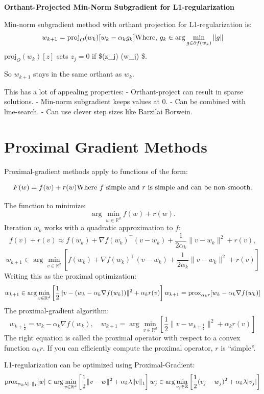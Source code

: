 \documentclass[
]{article}
\begin{document}
\textbf{Orthant-Projected Min-Norm Subgradient for L1-regularization}

Min-norm subgradient method with orthant projection for L1-regularization is:
\[
w_{k+1} = \text{proj}_O(w_k) [w_k - \alpha_k g_k]\\
\text{Where, } g_k \in \arg\min_{g \in \partial f(w_k)} \|g\|
\]
\(\text{proj}_O(w_k) [z]\) sets \(z_j = 0\) if \$(z\_j) \neq {}(w\_j) \$.

So \(w_{k+1}\) stays in the same orthant as \(w_k\).

This has a lot of appealing properties:
- Orthant-project can result in sparse solutions.
- Min-norm subgradient keeps values at 0.
- Can be combined with line-search.
- Can use clever step sizes like Barzilai Borwein.

\section{Proximal Gradient Methods}\label{proximal-gradient-methods}

Proximal-gradient methods apply to functions of the form:

\[
F(w) = f(w) + r(w)\\
\text{Where } f \text{ simple and } r \text{ is simple and can be non-smooth.}
\]

The function to minimize:
\[
\arg\min_{w \in \mathbb{R}^d} f(w) + r(w).
\]
Iteration \(w_k\) works with a quadratic approximation to \(f\):
\[
f(v) + r(v) \approx f(w_k) + \nabla f(w_k)^\top (v - w_k) + \frac{1}{2\alpha_k} \|v - w_k\|^2 + r(v),
\]
\[
w_{k+1} \in \arg\min_{v \in \mathbb{R}^d} \left[ f(w_k) + \nabla f(w_k)^\top (v - w_k) + \frac{1}{2\alpha_k} \|v - w_k\|^2 + r(v) \right]
\]
Writing this as the proximal optimization:
\[
w_{k+1} \in \arg\min_{v \in \mathbb{R}^d} \left[ \frac{1}{2} \|v - (w_k - \alpha_k \nabla f(w_k))\|^2 + \alpha_k r(v) \right]\\
w_{k+1} = \text{prox}_{\alpha_k r} [w_k - \alpha_k \nabla f(w_k)]
\]
The proximal-gradient algorithm:
\[
w_{k+\frac{1}{2}} = w_k - \alpha_k \nabla f(w_k), \quad w_{k+1} = \arg\min_{v \in \mathbb{R}^d} \left[ \frac{1}{2} \|v - w_{k+\frac{1}{2}}\|^2 + \alpha_k r(v) \right]
\]
The right equation is called the proximal operator with respect to a convex function \(\alpha_k r\). If you can efficiently compute the proximal operator, \(r\) is ``simple''.

L1-regularization can be optimized using Proximal-Gradient:
\[
\text{prox}_{\alpha_k \lambda \|\cdot\|_1} [w] \in \arg\min_{v \in \mathbb{R}^d} \left[ \frac{1}{2} \|v - w\|^2 + \alpha_k \lambda \|v\|_1 \right]\\
w_j \in \arg\min_{v_j \in \mathbb{R}} \left[ \frac{1}{2} (v_j - w_j)^2 + \alpha_k \lambda |v_j| \right]
\]
\end{document}
